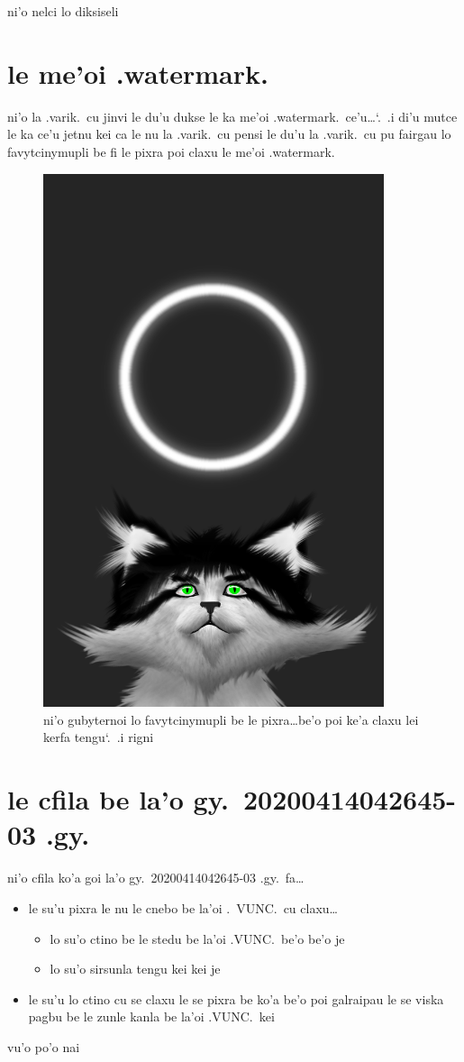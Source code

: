 \documentclass{report}
\newcommand\sds{\spacefactor\sfcode`.\ \space}
\begin{document}
ni'o nelci lo diksiseli

\section{le me'oi .watermark.}
ni'o la .varik.\ cu jinvi le du'u dukse le ka me'oi .watermark.\ ce'u\ldots\sds  .i di'u mutce le ka ce'u jetnu kei ca le nu la .varik.\ cu pensi le du'u la .varik.\ cu pu fairgau lo favytcinymupli be fi le pixra poi claxu le me'oi .watermark.

\begin{figure}[ht]
	\centering
	\includegraphics[width=10cm]{20200414042645-03/20200414042645-03-uw.png}
	\caption[center]{ni'o gubyternoi lo favytcinymupli be le pixra\ldots be'o poi ke'a claxu lei kerfa tengu\sds  .i rigni}
\end{figure}

\section{le cfila be la'o gy.\ 20200414042645-03 .gy.}
ni'o cfila ko'a goi la'o gy.\ 20200414042645-03 .gy.\ fa\ldots
\begin{itemize}
	\item le su'u pixra le nu le cnebo be la'oi .\ VUNC.\ cu claxu\ldots
	\begin{itemize}
		\item lo su'o ctino be le stedu be la'oi .VUNC.\ be'o be'o je
		\item lo su'o sirsunla tengu kei kei je
	\end{itemize}
	\item le su'u lo ctino cu se claxu le se pixra be ko'a be'o poi galraipau le se viska pagbu be le zunle kanla be la'oi .VUNC.\ kei
\end{itemize}
vu'o po'o nai
\end{document}
